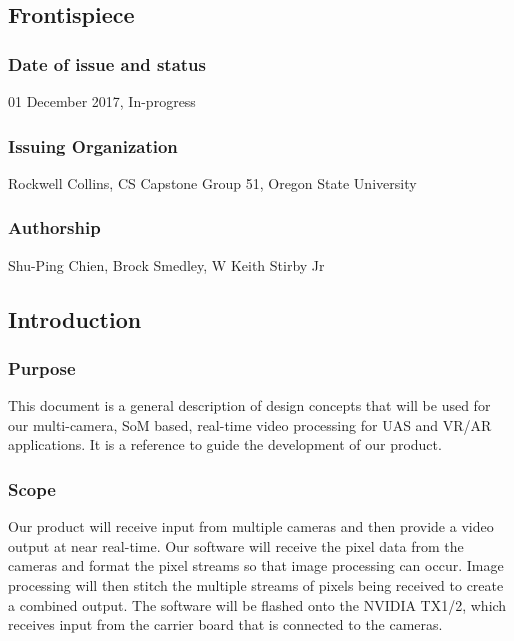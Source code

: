 \subsection{Frontispiece}

\subsubsection{Date of issue and status}

01 December 2017, In-progress \\

\subsubsection{Issuing Organization}

Rockwell Collins, CS Capstone Group 51, Oregon State University \\

\subsubsection{Authorship}

Shu-Ping Chien, Brock Smedley, W Keith Stirby Jr \\

\subsection{Introduction}

\subsubsection{Purpose}

This document is a general description of design concepts that will be used for our 
multi-camera, SoM based, real-time video processing for UAS and VR/AR applications. 
It is a reference to guide the development of our product.  \\

\subsubsection{Scope}

Our product will receive input from multiple cameras and then provide a video output at 
near real-time. Our software will receive the pixel data from the cameras and format 
the pixel streams so that image processing can occur. Image processing will then stitch 
the multiple streams of pixels being received to create a combined output. The software 
will be flashed onto the NVIDIA TX1/2, which receives input from the carrier 
board that is connected to the cameras. \\

